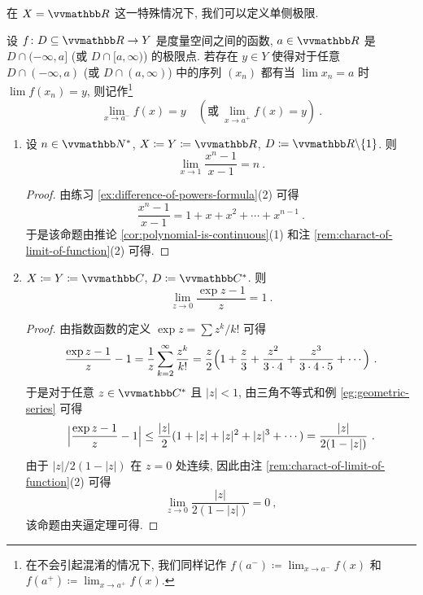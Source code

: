在 \(X = \R\) 这一特殊情况下, 我们可以定义单侧极限.

\begin{definition}[单侧极限]
    设 \(f \colon D \subseteq \R \to Y\) 是度量空间之间的函数, \(a \in \R\) 是 \(D \cap (- \infty, a]\) (或 \(D \cap [a, \infty)\)) 的极限点. 若存在 \(y \in Y\) 使得对于任意 \(D \cap (- \infty, a)\) (或 \(D \cap (a, \infty)\)) 中的序列 \((x_n)\) 都有当 \(\lim x_n = a\) 时 \(\lim f(x_n) = y\), 则记作\footnote{在不会引起混淆的情况下, 我们同样记作 \(f(a^-) \coloneqq \lim_{x \to a^-} f(x)\) 和 \(f(a^+) \coloneqq \lim_{x \to a^+} f(x)\).}
    \[
        \lim_{x \to a^-} f(x) = y\quad (\text{或}\ \lim_{x \to a^+} f(x) = y)\ .
    \]
\end{definition}

\begin{example}
    \begin{enumerate}
        \item 设 \(n \in \N^\ast\), \(X \coloneqq Y \coloneqq \R\), \(D \coloneqq \R \backslash \{1\}\). 则
        \[
            \lim_{x \to 1} \frac{x^n - 1}{x - 1} = n\ .
        \]
        \begin{proof}
            由练习 \ref{ex:difference-of-powers-formula}(2) 可得
            \[
                \frac{x^n - 1}{x - 1} = 1 + x + x^2 + \cdots + x^{n - 1}\ .
            \]
            于是该命题由推论 \ref{cor:polynomial-is-continuous}(1) 和注 \ref{rem:charact-of-limit-of-function}(2) 可得.
        \end{proof}
        \item \(X \coloneqq Y \coloneqq \C\), \(D \coloneqq \C^\ast\). 则
        \[
            \lim_{z \to 0} \frac{\exp z - 1}{z} = 1\ .
        \]
        \begin{proof}
            由指数函数的定义 \(\exp z = \sum z^k / k!\) 可得
            \[
                \frac{\exp z - 1}{z} - 1 = \frac{1}{z} \sum_{k = 2}^\infty \frac{z^k}{k!} = \frac{z}{2} \Bigl(1 + \frac{z}{3} + \frac{z^2}{3 \cdot 4} + \frac{z^3}{3 \cdot 4 \cdot 5} + \cdots\Bigr)\ .
            \]
            于是对于任意 \(z \in \C^\ast\) 且 \(|z| < 1\), 由三角不等式和例 \ref{eg:geometric-series} 可得
            \[
                \Bigl|\frac{\exp z - 1}{z} - 1\Bigr| \leq \frac{|z|}{2} (1 + |z| + |z|^2 + |z|^3 + \cdots) = \frac{|z|}{2 (1 - |z|)}\ .
            \]
            由于 \(|z| \big/ 2 (1 - |z|)\) 在 \(z = 0\) 处连续, 因此由注 \ref{rem:charact-of-limit-of-function}(2) 可得
            \[
                \lim_{z \to 0} \frac{|z|}{2 (1 - |z|)} = 0\ ,
            \]
            该命题由夹逼定理可得.

\end{proof}
\end{enumerate}
\end{example}
